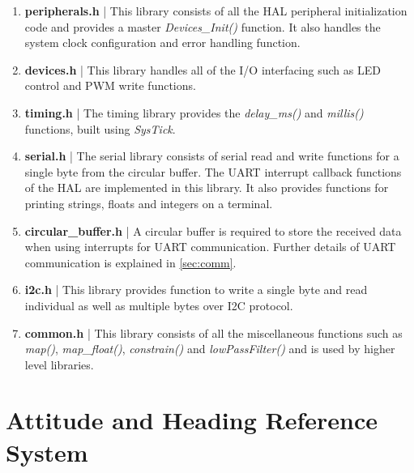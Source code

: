 \documentclass[a4paper,12pt,oneside]{book}
\begin{document}
\begin{enumerate}
\item  \textbf{peripherals.h} | This library consists of all the HAL peripheral initialization code and provides a master \textit{Devices{\_}Init()} function. It also handles the system clock configuration and error handling function.\\

\item \textbf{devices.h} | This library handles all of the I/O interfacing such as LED control and PWM write functions.\\

\item \textbf{timing.h} | The timing library provides the \textit{delay{\_}ms()} and \textit{millis()} functions, built using \textit{SysTick}.\\

\item \textbf{serial.h} | The serial library consists of serial read and write functions for a single byte from the circular buffer. The UART interrupt callback functions of the HAL are implemented in this library. It also provides functions for printing strings, floats and integers on a terminal.\\

\item \textbf{circular{\_}buffer.h} | A circular buffer is required to store the received data when using interrupts for UART communication. Further details of UART communication is explained in \autoref{sec:comm}.\\

\item \textbf{i2c.h} | This library provides function to write a single byte and read individual as well as multiple bytes over I2C protocol.\\

\item \textbf{common.h} | This library consists of all the miscellaneous functions such as \textit{map()}, \textit{map{\_}float()}, \textit{constrain()} and \textit{lowPassFilter()} and is used by higher level libraries.\\

\end{enumerate}

\section{Attitude and Heading Reference System}
\end{document}
